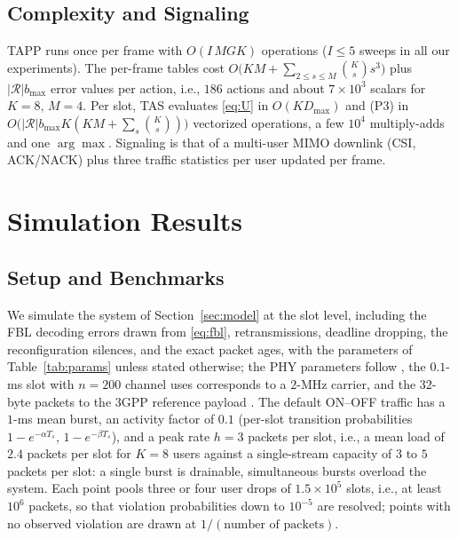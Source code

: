 \documentclass[journal]{IEEEtran}
\newcommand{\Dmax}{D_{\max}}
\begin{document}
\subsection{Complexity and Signaling}\label{sec:complexity}
TAPP runs once per frame with $O(I\,MGK)$ operations ($I\le5$ sweeps in all our experiments). The per-frame tables cost $O\big(KM+\sum_{2\le s\le M}\binom{K}{s}s^3\big)$ plus $|\mathcal R|b_{\max}$ error values per action, i.e., $186$ actions and about $7\times10^3$ scalars for $K=8$, $M=4$. Per slot, TAS evaluates \eqref{eq:U} in $O(K\Dmax)$ and (P3) in $O\big(|\mathcal R|b_{\max}K(KM+\sum_s\binom{K}{s})\big)$ vectorized operations, a few $10^4$ multiply-adds and one $\arg\max$. Signaling is that of a multi-user MIMO downlink (CSI, ACK/NACK) plus three traffic statistics per user updated per frame.

\section{Simulation Results}\label{sec:results}
\subsection{Setup and Benchmarks}
We simulate the system of Section~\ref{sec:model} at the slot level, including the FBL decoding errors drawn from \eqref{eq:fbl}, retransmissions, deadline dropping, the reconfiguration silences, and the exact packet ages, with the parameters of Table~\ref{tab:params} unless stated otherwise; the PHY parameters follow \cite{Ouyang2026SWAN,Gu2026HSSA}, the $0.1$-ms slot with $n=200$ channel uses corresponds to a $2$-MHz carrier, and the $32$-byte packets to the 3GPP reference payload \cite{3GPP-TS22104}. The default ON--OFF traffic has a $1$-ms mean burst, an activity factor of $0.1$ (per-slot transition probabilities $1-e^{-\alpha T_s}$, $1-e^{-\beta T_s}$), and a peak rate $h=3$ packets per slot, i.e., a mean load of $2.4$ packets per slot for $K=8$ users against a single-stream capacity of $3$ to $5$ packets per slot: a single burst is drainable, simultaneous bursts overload the system. Each point pools three or four user drops of $1.5\times10^{5}$ slots, i.e., at least $10^{6}$ packets, so that violation probabilities down to $10^{-5}$ are resolved; points with no observed violation are drawn at $1/(\text{number of packets})$.
\end{document}
